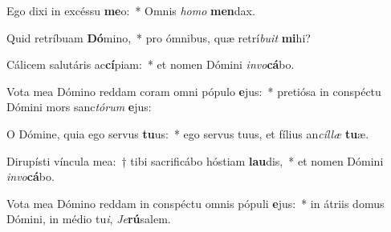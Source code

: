 \item Ego dixi in excéssu \textbf{me}o:~* Omnis \textit{ho}\textit{mo} \textbf{men}dax.
\item Quid retríbuam \textbf{Dó}mino,~* pro ómnibus, quæ retrí\textit{bu}\textit{it} \textbf{mi}hi?
\item Cálicem salutáris ac\textbf{cí}piam:~* et nomen Dómini \textit{in}\textit{vo}\textbf{cá}bo.
\item Vota mea Dómino reddam coram omni pópulo \textbf{e}jus:~* pretiósa in conspéctu Dómini mors sanc\textit{tó}\textit{rum} \textbf{e}jus:
\item O Dómine, quia ego servus \textbf{tu}us:~* ego servus tuus, et fílius an\textit{cíl}\textit{læ} \textbf{tu}æ.
\item Dirupísti víncula mea:~† tibi sacrificábo hóstiam \textbf{lau}dis,~* et nomen Dómini \textit{in}\textit{vo}\textbf{cá}bo.
\item Vota mea Dómino reddam in conspéctu omnis pópuli \textbf{e}jus:~* in átriis domus Dómini, in médio tu\textit{i}, \textit{Je}\textbf{rú}salem.
